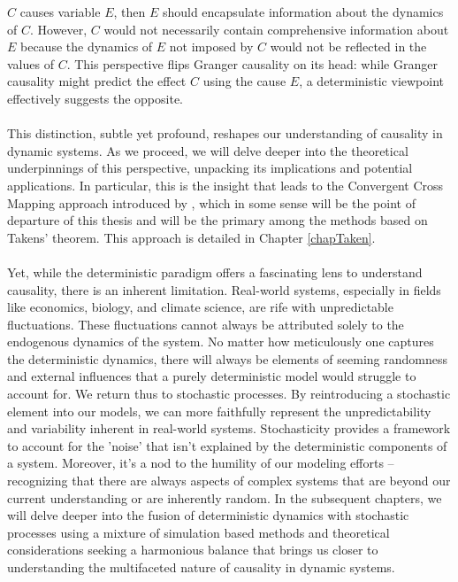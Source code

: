 \documentclass[11pt, a4paper]{memoir}
\theoremstyle{plain}
\theoremstyle{definition}
\begin{document}
$C$ causes variable $E$, then $E$ should encapsulate information about the dynamics of $C$. However, $C$ would not necessarily contain comprehensive information about $E$ because the dynamics of $E$ not imposed by $C$ would not be reflected in the values of $C$. This perspective flips Granger causality on its head: while Granger causality might predict the effect 
$C$ using the cause $E$, a deterministic viewpoint effectively suggests the opposite. \\\\
This distinction, subtle yet profound, reshapes our understanding of causality in dynamic systems. As we proceed, we will delve deeper into the theoretical underpinnings of this perspective, unpacking its implications and potential applications. In particular, this is the insight that leads to the Convergent Cross Mapping approach introduced by \cite{Sugihara}, which in some sense will be the point of departure of this thesis and will be the primary among the methods based on Takens' theorem. This approach is detailed in Chapter \ref{chapTaken}.\\\\
Yet, while the deterministic paradigm offers a fascinating lens to understand causality, there is an inherent limitation. Real-world systems, especially in fields like economics, biology, and climate science, are rife with unpredictable fluctuations. These fluctuations cannot always be attributed solely to the endogenous dynamics of the system. No matter how meticulously one captures the deterministic dynamics, there will always be elements of seeming randomness and external influences that a purely deterministic model would struggle to account for. We return thus to stochastic processes. By reintroducing a stochastic element into our models, we can more faithfully represent the unpredictability and variability inherent in real-world systems. Stochasticity provides a framework to account for the 'noise' that isn't explained by the deterministic components of a system. Moreover, it's a nod to the humility of our modeling efforts – recognizing that there are always aspects of complex systems that are beyond our current understanding or are inherently random. 
In the subsequent chapters, we will delve deeper into the fusion of deterministic dynamics with stochastic processes using  a mixture of simulation based methods and theoretical considerations seeking a harmonious balance that brings us closer to understanding the multifaceted nature of causality in dynamic systems.
\end{document}
